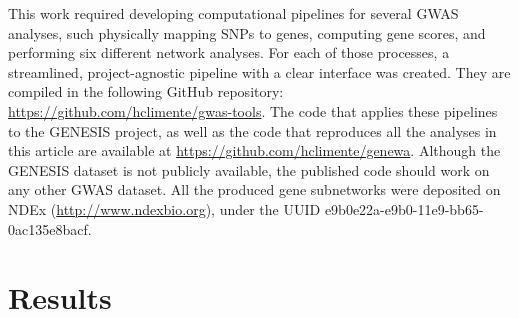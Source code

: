 \documentclass[twocolumn, 10pt]{article}
\begin{document}
This work required developing computational pipelines for several GWAS analyses, such physically mapping SNPs to genes, computing gene scores, and performing six different network analyses. For each of those processes, a streamlined, project-agnostic pipeline with a clear interface was created. They are compiled in the following GitHub repository: \url{https://github.com/hclimente/gwas-tools}. The code that applies these pipelines to the GENESIS project, as well as the code that reproduces all the analyses in this article are available at \url{https://github.com/hclimente/genewa}. Although the GENESIS dataset is not publicly available, the published code should work on any other GWAS dataset. All the produced gene subnetworks were deposited on NDEx (\url{http://www.ndexbio.org}), under the UUID e9b0e22a-e9b0-11e9-bb65-0ac135e8bacf.

\section{Results}
\label{sec:orgc718f04}
\end{document}
